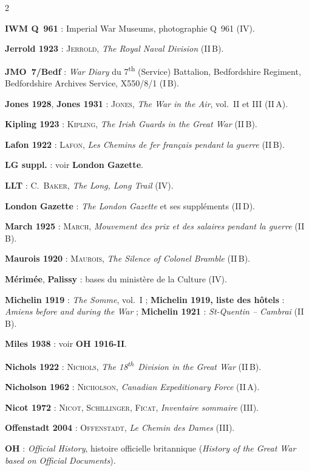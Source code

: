 \begin{multicols}{2}
\begin{biblist}
\item \textbf{IWM Q~961} : Imperial War Museums, photographie Q~961 (IV).
\item \textbf{Jerrold 1923} : \textsc{Jerrold}, \textit{The Royal Naval Division} (II\,B).
\item \textbf{JMO~7/Bedf} : \textit{War Diary} du 7\textsuperscript{th} (Service) Battalion, Bedfordshire Regiment, Bedfordshire Archives Service, X550/8/1 (I\,B).
\item \textbf{Jones 1928}, \textbf{Jones 1931} : \textsc{Jones}, \textit{The War in the Air}, vol.~II et III (II\,A).
\item \textbf{Kipling 1923} : \textsc{Kipling}, \textit{The Irish Guards in the Great War} (II\,B).
\item \textbf{Lafon 1922} : \textsc{Lafon}, \textit{Les Chemins de fer français pendant la guerre} (II\,B).
\item \textbf{LG suppl.} : voir \textbf{London Gazette}.
\item \textbf{LLT} : C.~\textsc{Baker}, \textit{The Long, Long Trail} (IV).
\item \textbf{London Gazette} : \textit{The London Gazette} et ses suppléments (II\,D).
\item \textbf{March 1925} : \textsc{March}, \textit{Mouvement des prix et des salaires pendant la guerre} (II\,B).
\item \textbf{Maurois 1920} : \textsc{Maurois}, \textit{The Silence of Colonel Bramble} (II\,B).
\item \textbf{Mérimée}, \textbf{Palissy} : bases du ministère de la Culture (IV).
\item \textbf{Michelin 1919} : \textit{The Somme}, vol.~I ; \textbf{Michelin 1919, liste des hôtels} : \textit{Amiens before and during the War} ; \textbf{Michelin 1921} : \textit{St-Quentin -- Cambrai} (II\,B).
\item \textbf{Miles 1938} : voir \textbf{OH 1916-II}.
\item \textbf{Nichols 1922} : \textsc{Nichols}, \textit{The 18\textsuperscript{th}~Division in the Great War} (II\,B).
\item \textbf{Nicholson 1962} : \textsc{Nicholson}, \textit{Canadian Expeditionary Force} (II\,A).
\item \textbf{Nicot 1972} : \textsc{Nicot}, \textsc{Schillinger}, \textsc{Ficat}, \textit{Inventaire sommaire} (III).
\item \textbf{Offenstadt 2004} : \textsc{Offenstadt}, \textit{Le Chemin des Dames} (III).
\item \textbf{OH} : \textit{Official History}, histoire officielle britannique (\textit{History of the Great War based on Official Documents}).

\end{biblist}
\end{multicols}
